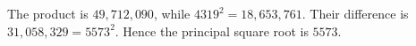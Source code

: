 The product is $49,712,090$, while $4319^2=18,653,761$. Their difference is $31,058,329=5573^2$. Hence the principal square root is $\boxed{5573}$.
